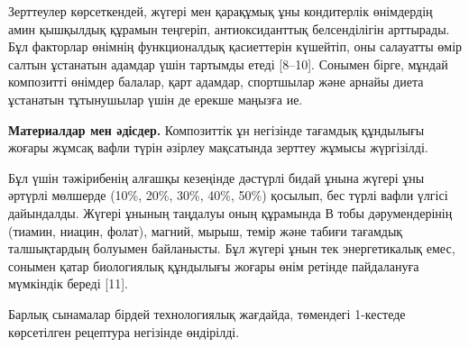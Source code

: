 \begin{multicols}{2}
Зерттеулер көрсеткендей, жүгері мен қарақұмық ұны кондитерлік өнімдердің
амин қышқылдық құрамын теңгеріп, антиоксиданттық белсенділігін
арттырады. Бұл факторлар өнімнің функционалдық қасиеттерін күшейтіп, оны
салауатты өмір салтын ұстанатын адамдар үшін тартымды етеді {[}8--10{]}.
Сонымен бірге, мұндай композитті өнімдер балалар, қарт адамдар,
спортшылар және арнайы диета ұстанатын тұтынушылар үшін де ерекше
маңызға ие.

{\bfseries Материалдар мен әдісдер.} Композиттік ұн негізінде тағамдық
құндылығы жоғары жұмсақ вафли түрін әзірлеу мақсатында зерттеу жұмысы
жүргізілді.

Бұл үшін тәжірибенің алғашқы кезеңінде дәстүрлі бидай ұнына жүгері ұны
әртүрлі мөлшерде (10\%, 20\%, 30\%, 40\%, 50\%) қосылып, бес түрлі вафли
үлгісі дайындалды. Жүгері ұнының таңдалуы оның құрамында В тобы
дәрумендерінің (тиамин, ниацин, фолат), магний, мырыш, темір және табиғи
тағамдық талшықтардың болуымен байланысты. Бұл жүгері ұнын тек
энергетикалық емес, сонымен қатар биологиялық құндылығы жоғары өнім
ретінде пайдалануға мүмкіндік береді {[}11{]}.

Барлық сынамалар бірдей технологиялық жағдайда, төмендегі 1-кестеде
көрсетілген рецептура негізінде өндірілді.
\end{multicols}

